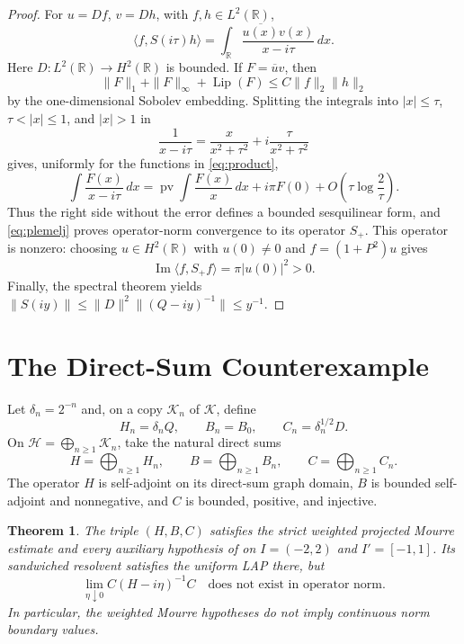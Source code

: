 \documentclass[11pt]{article}
\newtheorem{theorem}{Theorem}
\newcommand{\R}{\mathbb R}
\newcommand{\Hc}{\mathcal H}
\newcommand{\Kc}{\mathcal K}
\begin{document}
\begin{proof}
For $u=Df$, $v=Dh$, with $f,h\in L^2(\R)$,
\[
 \langle f,S(i\tau)h\rangle
   =\int_{\R}\frac{\overline{u(x)}v(x)}{x-i\tau}\,dx.
 \tag{5}\label{eq:form}
\]
Here $D:L^2(\R)\to H^2(\R)$ is bounded.  If
$F=\overline uv$, then
\[
 \|F\|_1+\|F\|_\infty+\operatorname{Lip}(F)
 \leq C\|f\|_2\|h\|_2
 \tag{6}\label{eq:product}
\]
by the one-dimensional Sobolev embedding.  Splitting the integrals into
$|x|\leq\tau$, $\tau<|x|\leq1$, and $|x|>1$ in
\[
 \frac1{x-i\tau}=\frac{x}{x^2+\tau^2}
       +i\frac{\tau}{x^2+\tau^2}
\]
gives, uniformly for the functions in \eqref{eq:product},
\[
 \int\frac{F(x)}{x-i\tau}\,dx
 =\operatorname{pv}\!\int\frac{F(x)}x\,dx+i\pi F(0)
   +O\!\left(\tau\log\frac2\tau\right).
 \tag{7}\label{eq:plemelj}
\]
Thus the right side without the error defines a bounded sesquilinear form,
and \eqref{eq:plemelj} proves operator-norm convergence to its operator
$S_+$.  This operator is nonzero: choosing $u\in H^2(\R)$ with $u(0)\ne0$
and $f=(1+P^2)u$ gives
\[
 \operatorname{Im}\langle f,S_+f\rangle=\pi|u(0)|^2>0.
\]
Finally, the spectral theorem yields
$\|S(iy)\|\leq\|D\|^2\|(Q-iy)^{-1}\|\leq y^{-1}$.
\end{proof}

\section*{The Direct-Sum Counterexample}

Let $\delta_n=2^{-n}$ and, on a copy $\Kc_n$ of $\Kc$, define
\[
 H_n=\delta_nQ,\qquad B_n=B_0,
 \qquad C_n=\delta_n^{1/2}D.
\]
On $\Hc=\bigoplus_{n\geq1}\Kc_n$, take the natural direct sums
\[
 H=\bigoplus_{n\geq1}H_n,\qquad
 B=\bigoplus_{n\geq1}B_n,\qquad
 C=\bigoplus_{n\geq1}C_n.
 \tag{8}\label{eq:sums}
\]
The operator $H$ is self-adjoint on its direct-sum graph domain, $B$ is
bounded self-adjoint and nonnegative, and $C$ is bounded, positive, and
injective.

\begin{theorem}\label{thm:counterexample}
The triple $(H,B,C)$ satisfies the strict weighted projected Mourre estimate
and every auxiliary hypothesis of \cite[Theorem~3.4]{GJ} on
$I=(-2,2)$ and $I'=[-1,1]$.  Its sandwiched resolvent satisfies the uniform
LAP there, but
\[
 \lim_{\eta\downarrow0}C(H-i\eta)^{-1}C
 \quad\text{does not exist in operator norm}.
 \tag{9}\label{eq:no-limit}
\]
In particular, the weighted Mourre hypotheses do not imply continuous norm
boundary values.
\end{theorem}
\end{document}
